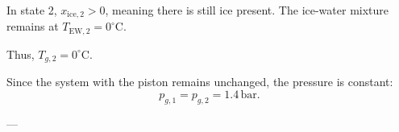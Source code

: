 In state 2, \( x_{\text{ice},2} > 0 \), meaning there is still ice present. The ice-water mixture remains at \( T_{\text{EW},2} = 0^\circ\text{C} \).  

Thus, \( T_{g,2} = 0^\circ\text{C} \).  

Since the system with the piston remains unchanged, the pressure is constant:  
\[
p_{g,1} = p_{g,2} = 1.4 \, \text{bar}.
\]

---